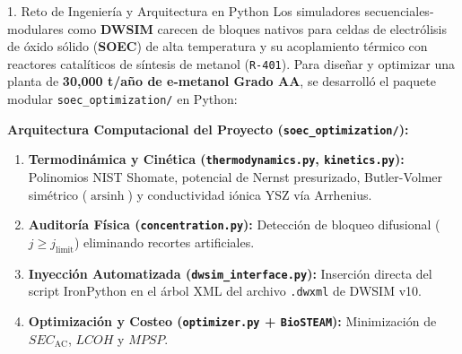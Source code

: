 \documentclass[12pt]{article}
\begin{document}
\vspace{0.14cm}

\noindent
\begin{minipage}[t]{0.49\linewidth}
    \vspace{0pt}

    \begin{posterbox}[primaryblue]{1. Reto de Ingeniería y Arquitectura en Python}
        \fontsize{16}{20}\selectfont
        Los simuladores secuenciales-modulares como \textbf{DWSIM} carecen de bloques nativos para celdas de electrólisis de óxido sólido (\textbf{SOEC}) de alta temperatura y su acoplamiento térmico con reactores catalíticos de síntesis de metanol (\texttt{R-401}). Para diseñar y optimizar una planta de \textbf{30,000 t/año de e-metanol Grado AA}, se desarrolló el paquete modular \texttt{soec\_optimization/} en Python:

        \vspace{8pt}
        \begin{tcolorbox}[colback=tablerowgray, colframe=primaryblue!40, boxrule=1.5pt, arc=4pt, top=8pt, bottom=8pt]
            \fontsize{15}{19.5}\selectfont
            \textbf{\color{primaryblue}Arquitectura Computacional del Proyecto (\texttt{soec\_optimization/}):}
            \begin{enumerate}[leftmargin=*, itemsep=4pt, topsep=4pt]
                \item \textbf{Termodinámica y Cinética (\texttt{thermodynamics.py}, \texttt{kinetics.py}):} Polinomios NIST Shomate, potencial de Nernst presurizado, Butler-Volmer simétrico ($\operatorname{arsinh}$) y conductividad iónica YSZ vía Arrhenius.
                \item \textbf{Auditoría Física (\texttt{concentration.py}):} Detección de bloqueo difusional ($j \ge j_{\text{limit}}$) eliminando recortes artificiales.
                \item \textbf{Inyección Automatizada (\texttt{dwsim\_interface.py}):} Inserción directa del script IronPython en el árbol XML del archivo \texttt{.dwxml} de DWSIM v10.
                \item \textbf{Optimización y Costeo (\texttt{optimizer.py} + \texttt{BioSTEAM}):} Minimización de $SEC_{\text{AC}}$, $LCOH$ y $MPSP$.
            \end{enumerate}
        \end{tcolorbox}
    \end{posterbox}


\end{minipage}
\end{document}
